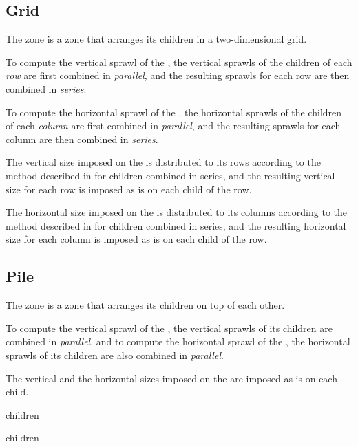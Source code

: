 \subsection{Grid}
\label{sec-zones-layout-grid}

The  zone is a zone that arranges its children in a
two-dimensional grid.  

To compute the vertical sprawl of the , the vertical
sprawls of the children of each \emph{row} are first combined in
\emph{parallel}, and the resulting sprawls for each row are then
combined in \emph{series}.  

To compute the horizontal sprawl of the , the horizontal
sprawls of the children of each \emph{column} are first combined in
\emph{parallel}, and the resulting sprawls for each column are then
combined in \emph{series}.

The vertical size imposed on the  is distributed to its
rows according to the method described in
 for children combined in
series, and the resulting vertical size for each row is imposed as is
on each child of the row.

The horizontal size imposed on the  is distributed to its
columns according to the method described in
 for children combined in
series, and the resulting horizontal size for each column is imposed
as is on each child of the row.

\subsection{Pile}
\label{sec-zones-layout-pile}

The  zone is a zone that arranges its children on top of
each other.

To compute the vertical sprawl of the , the vertical
sprawls of its children are combined in \emph{parallel}, and to
compute the horizontal sprawl of the , the horizontal
sprawls of its children are also combined in \emph{parallel}. 


The vertical and the horizontal sizes imposed on the 
are imposed as is on each child.


 {children}

 {\rest children}

